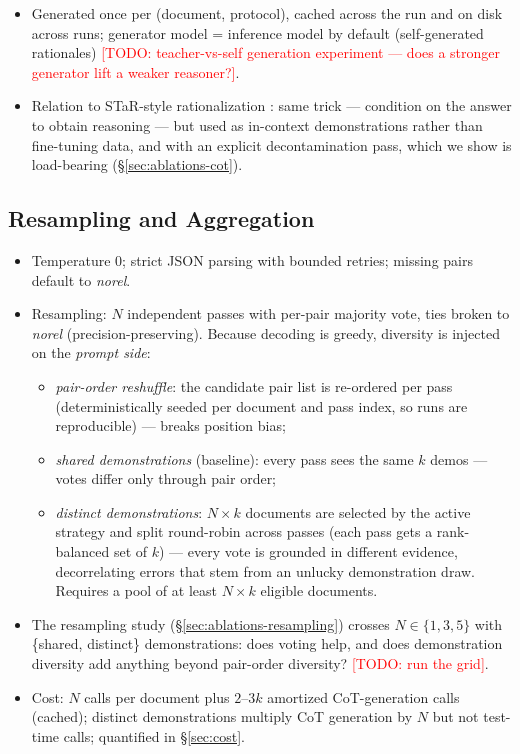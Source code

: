 \documentclass[11pt]{article}
\newcommand{\todo}[1]{\textcolor{red}{[TODO: #1]}}
\begin{document}
\begin{itemize}
  \item Generated once per (document, protocol), cached across the run and
        on disk across runs; generator model = inference model by default
        (self-generated rationales) \todo{teacher-vs-self generation
        experiment --- does a stronger generator lift a weaker reasoner?}.
  \item Relation to STaR-style rationalization \citep{zelikman2022star}:
        same trick --- condition on the answer to obtain reasoning --- but used
        as in-context demonstrations rather than fine-tuning data, and with an
        explicit decontamination pass, which we show is load-bearing
        (\S\ref{sec:ablations-cot}).
\end{itemize}

\subsection{Resampling and Aggregation}
\label{sec:inference}
\begin{itemize}
  \item Temperature 0; strict JSON parsing with bounded retries; missing pairs
        default to \textit{norel}.
  \item Resampling: $N$ independent passes with per-pair majority vote, ties
        broken to \textit{norel} (precision-preserving). Because decoding is
        greedy, diversity is injected on the \emph{prompt side}:
        \begin{itemize}
          \item \emph{pair-order reshuffle}: the candidate pair list is
                re-ordered per pass (deterministically seeded per document and
                pass index, so runs are reproducible) --- breaks position bias;
          \item \emph{shared demonstrations} (baseline): every pass sees the
                same $k$ demos --- votes differ only through pair order;
          \item \emph{distinct demonstrations}: $N \times k$ documents are
                selected by the active strategy and split round-robin across
                passes (each pass gets a rank-balanced set of $k$) --- every
                vote is grounded in different evidence, decorrelating errors
                that stem from an unlucky demonstration draw. Requires a pool
                of at least $N \times k$ eligible documents.
        \end{itemize}
  \item The resampling study (\S\ref{sec:ablations-resampling}) crosses
        $N \in \{1, 3, 5\}$ with \{shared, distinct\} demonstrations:
        does voting help, and does demonstration diversity add anything beyond
        pair-order diversity? \todo{run the grid}.
  \item Cost: $N$ calls per document plus $2$--$3k$ amortized CoT-generation
        calls (cached); distinct demonstrations multiply CoT generation by
        $N$ but not test-time calls; quantified in \S\ref{sec:cost}.
\end{itemize}
\end{document}
